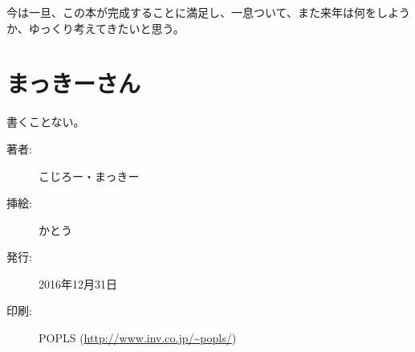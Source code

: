 \documentclass[10pt,b5paper,openany]{jsbook}
\begin{document}
今は一旦、この本が完成することに満足し、一息ついて、また来年は何をしようか、ゆっくり考えてきたいと思う。

\section*{まっきーさん}
書くことない。

\begin{minipage}{0.5\paperwidth}
	\begin{description}
		\item[著者:]こじろー・まっきー
		\item[挿絵:]かとう
		\item[発行:]2016年12月31日
		\item[印刷:]POPLS (\url{http://www.inv.co.jp/~popls/})
	\end{description}
\end{minipage}
\end{document}
